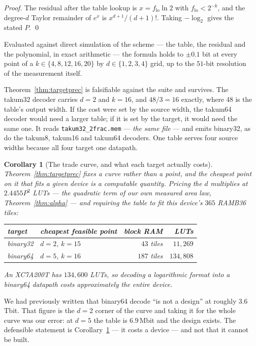 \documentclass[11pt]{article}
\newtheorem{corollary}{Corollary}
\theoremstyle{definition}
\begin{document}
\begin{proof}
The residual after the table lookup is $x = f_{\mathrm{lo}}\ln 2$ with
$f_{\mathrm{lo}} < 2^{-k}$, and the degree-$d$ Taylor remainder of $e^{x}$ is
$x^{d+1}/(d+1)!$. Taking $-\log_2$ gives the stated $P$. \qed
\end{proof}

Evaluated against direct simulation of the scheme --- the table, the residual and
the polynomial, in exact arithmetic --- the formula holds to $\pm 0.1$ bit at every
point of a $k \in \{4,8,12,16,20\}$ by $d \in \{1,2,3,4\}$ grid, up to the
$51$-bit resolution of the measurement itself.

Theorem~\ref{thm:targetprec} is falsifiable against the suite and survives. The
takum32 decoder carries $d = 2$ and $k = 16$, and $48/3 = 16$ exactly, where 48 is
the table's output width. If the cost were set by the source width, the takum64
decoder would need a larger table; if it is set by the target, it would need the
same one. It reads \texttt{takum32\_2frac.mem} --- \emph{the same file} --- and
emits binary32, as do the takum8, takum16 and takum64 decoders. One table serves
four source widths because all four target one datapath.

\begin{corollary}[The trade curve, and what each target actually costs]
\label{cor:tradecurve}
Theorem~\ref{thm:targetprec} fixes a curve rather than a point, and the cheapest
point on it that fits a given device is a computable quantity. Pricing the $d$
multiplies at $2.4455 P^{2}$ LUTs --- the quadratic term of our own measured area
law, Theorem~\ref{thm:alpha} --- and requiring the table to fit this device's
$365$ RAMB36 tiles:
\begin{center}
\begin{tabular}{llrr}
\toprule
target & cheapest feasible point & block RAM & LUTs \\
\midrule
binary32 & $d = 2$, $k = 15$ & $43$ tiles & $11{,}269$ \\
binary64 & $d = 5$, $k = 16$ & $187$ tiles & $134{,}808$ \\
\bottomrule
\end{tabular}
\end{center}
An XC7A200T has $134{,}600$ LUTs, so decoding a logarithmic format into a
binary64 datapath costs approximately the entire device.
\end{corollary}

We had previously written that binary64 decode ``is not a design'' at roughly
$3.6$\,Tbit. That figure is the $d = 2$ corner of the curve and taking it for the
whole curve was our error: at $d = 5$ the table is $6.9$\,Mbit and the design
exists. The defensible statement is Corollary~\ref{cor:tradecurve} --- it costs a
device --- and not that it cannot be built.
\end{document}
